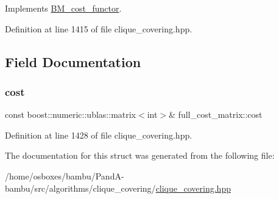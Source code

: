 Implements \hyperlink{structBM__cost__functor_aa138a13f4daa2aee5b9e5b6315411bb1}{B\+M\+\_\+cost\+\_\+functor}.



Definition at line 1415 of file clique\+\_\+covering.\+hpp.



\subsection{Field Documentation}
\mbox{\label{structfull__cost__matrix_a96e016aafef40650768c051e2adeabce}} 
\subsubsection{\texorpdfstring{cost}{cost}}
{\footnotesize\ttfamily const boost\+::numeric\+::ublas\+::matrix$<$int$>$\& full\+\_\+cost\+\_\+matrix\+::cost\hspace{0.3cm}{\ttfamily [private]}}



Definition at line 1428 of file clique\+\_\+covering.\+hpp.



The documentation for this struct was generated from the following file\+:\begin{DoxyCompactItemize}
\item 
/home/osboxes/bambu/\+Pand\+A-\/bambu/src/algorithms/clique\+\_\+covering/\hyperlink{clique__covering_8hpp}{clique\+\_\+covering.\+hpp}\end{DoxyCompactItemize}

